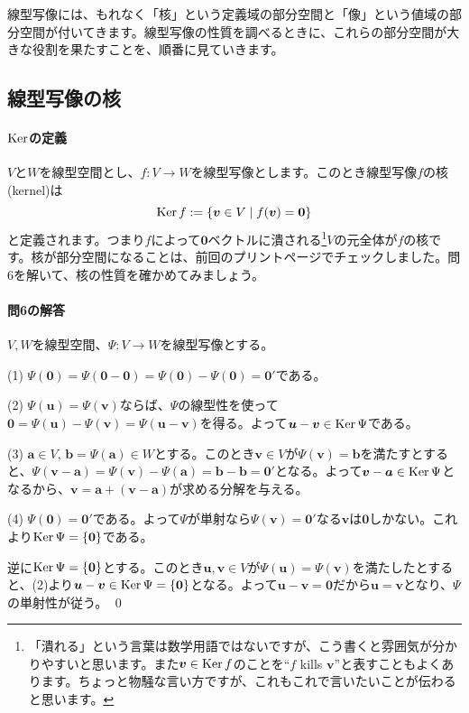 線型写像には、もれなく「核」という定義域の部分空間と「像」という値域の部分空間が付いてきます。線型写像の性質を調べるときに、これらの部分空間が大きな役割を果たすことを、順番に見ていきます。

\subsection{線型写像の核}

\paragraph{$\operatorname{Ker}$の定義}

$V$と$W$を線型空間とし、$f\colon V\rightarrow W$を線型写像とします。このとき線型写像$f$の核(kernel)は
\[
\operatorname{Ker} f:=\{\boldsymbol{v}\in V\mid f(\boldsymbol{v})=\boldsymbol{0}\}
\]
と定義されます。つまり$f$によって$\bm{0}$ベクトルに潰される\footnote{「潰れる」という言葉は数学用語ではないですが、こう書くと雰囲気が分かりやすいと思います。また$\boldsymbol{v}\in\operatorname{Ker} f$のことを``$f$ kills $\bm{v}$''と表すこともよくあります。ちょっと物騒な言い方ですが、これもこれで言いたいことが伝わると思います。}$V$の元全体が$f$の核です。核が部分空間になることは、前回のプリント\pageref{subsec:kernel}ページでチェックしました。問6を解いて、核の性質を確かめてみましょう。

\paragraph{問6の解答} $V, W$を線型空間、$\Psi\colon V\rightarrow W$を線型写像とする。

\noindent (1) $\Psi(\bm{0}) = \Psi(\bm{0} - \bm{0}) = \Psi(\bm{0}) - \Psi(\bm{0}) = \bm{0}'$である。

\noindent (2) $\Psi(\bm{u}) = \Psi(\bm{v})$ならば、$\Psi$の線型性を使って$\bm{0} = \Psi(\bm{u}) - \Psi(\bm{v}) = \Psi(\bm{u} - \bm{v})$を得る。よって$\boldsymbol{u} - \boldsymbol{v} \in \operatorname{Ker}\Psi$である。

\noindent (3) $\bm{a}\in V$, $\bm{b} = \Psi(\bm{a})\in W$とする。このとき$\bm{v}\in V$が$\Psi(\bm{v}) = \bm{b}$を満たすとすると、$\Psi(\bm{v} - \bm{a}) = \Psi(\bm{v}) - \Psi(\bm{a}) = \bm{b} - \bm{b} = \bm{0}'$となる。よって$\boldsymbol{v} - \boldsymbol{a} \in \operatorname{Ker}\Psi$となるから、$\bm{v} = \bm{a} + (\bm{v} - \bm{a})$が求める分解を与える。

\noindent (4) $\Psi(\bm{0}) = \bm{0}'$である。よって$\Psi$が単射なら$\Psi(\bm{v}) = \bm{0}'$なる$\bm{v}$は$\bm{0}$しかない。これより$\operatorname{Ker}\Psi=\{\boldsymbol{0}\}$である。

逆に$\operatorname{Ker}\Psi = \{\boldsymbol{0}\}$とする。このとき$\bm{u}, \bm{v}\in V$が$\Psi(\bm{u}) = \Psi(\bm{v})$を満たしたとすると、(2)より$\boldsymbol{u} - \boldsymbol{v} \in \operatorname{Ker}\Psi = \{\boldsymbol{0}\}$となる。よって$\bm{u} - \bm{v} = \bm{0}$だから$\bm{u} = \bm{v}$となり、$\Psi$の単射性が従う。 \qed

